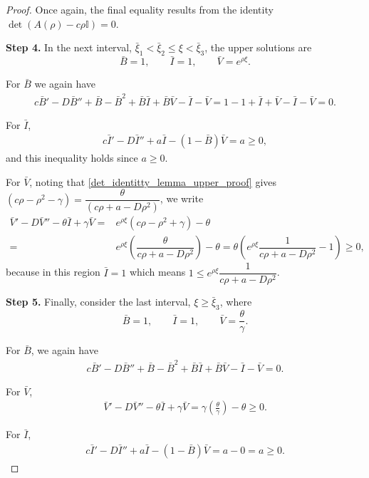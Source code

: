 \documentclass[11pt]{article}
\theoremstyle{definition}
\begin{document}
\begin{proof}
Once again, the final equality results from the identity $\det(A(\rho)-c\rho \mathbb{I})=0$.

\textbf{Step 4.} In the next interval, $\bar{\xi}_1 < \bar{\xi}_2 \le \xi < \bar{\xi}_3$, the upper solutions are  
\[
\bar{B}=1, \qquad
\bar{I}= 1,
\qquad 
\bar{V}=e^{\rho \xi}.
\]

For $\bar{B}$ we again have
\begin{align}
c\bar{B}'-D\bar{B}''+\bar{B}-\bar{B}^{2}+\bar{B}\bar{I}+\bar{B}\bar{V}-\bar{I}-\bar{V}
= 1 - 1 + \bar{I} + \bar{V} - \bar{I} - \bar{V}
=0.
\end{align}

For $\bar{I}$,
\begin{align}
c\bar{I}' - D\bar{I}'' + a\bar{I} -(1-\bar{B}) \bar{V}
= a
\ge 0,
\end{align}
and this inequality holds since $a\ge0.$

For $\bar{V}$, noting that \eqref{det_identitty_lemma_upper_proof} gives $(c\rho - \rho^{2} - \gamma)=\dfrac{\theta}{(c \rho+a-D\rho^{2})}$, we write
\begin{align}
\bar{V}'-D\bar{V}''- \theta \bar{I} + \gamma \bar{V}
=& e^{\rho \xi}\left(c \rho-\rho^2+\gamma \right) - \theta
\\=& e^{\rho \xi}\left(\dfrac{\theta}{c\rho+a-D\rho^2}\right) - \theta =\theta\left(e^{\rho \xi}\dfrac{1}{c \rho+a-D\rho^2}-1\right)
\ge 0,
\end{align}
because in this region $\bar{I}=1$ which means $1\le e^{\rho \xi} \dfrac{1}{c \rho+a-D\rho^2}$.


\textbf{Step 5.} Finally, consider the last interval, $\xi \ge \bar{\xi}_3$, where  
\[
\bar{B}=1, 
\qquad 
\bar{I}=1,
\qquad 
\bar{V}=\frac{\theta}{\gamma}.
\]

For $\bar{B}$, we again have
\begin{align}
c\bar{B}'-D\bar{B}''+\bar{B}-\bar{B}^{2}+\bar{B}\bar{I}+\bar{B}\bar{V}-\bar{I}-\bar{V}
=0.
\end{align}

For $\bar{V}$,
\begin{align}
\bar{V}'-D\bar{V}''- \theta \bar{I} + \gamma \bar{V}
= \gamma\left(\frac{\theta}{\gamma}\right) - \theta
\ge0.
\end{align}

For $\bar{I}$,
\begin{align}
c\bar{I}'-D\bar{I}'' + a\bar{I} - (1-\bar{B})\bar{V}
= a - 0
= a \ge 0.
\end{align}

\end{proof}
\end{document}
